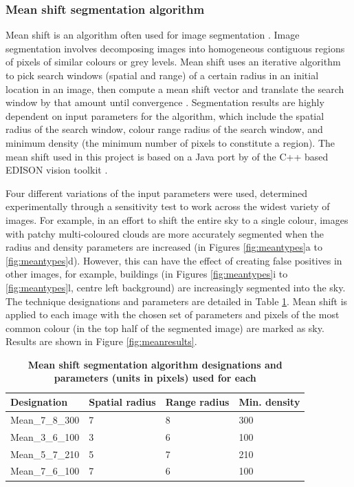 \documentclass[final,3p,times,authoryear]{elsarticle}
\begin{document}
\subsubsection{Mean shift segmentation algorithm}\label{sec:mean}

Mean shift is an algorithm often used for image segmentation \citep{Comaniciu1997,Comaniciu2002}. Image segmentation involves decomposing images into homogeneous contiguous regions of pixels of similar colours or grey levels. Mean shift uses an iterative algorithm to pick search windows (spatial and range) of a certain radius in an initial location in an image, then compute a mean shift vector and translate the search window by that amount until convergence \citep{Comaniciu1997}. Segmentation results are highly dependent on input parameters for the algorithm, which include the spatial radius of the search window, colour range radius of the search window, and minimum density (the minimum number of pixels to constitute a region). The mean shift used in this project is based on a Java port by \cite{Pangburn2002} of the C++ based EDISON vision toolkit \citep{Christoudias2002}. 

Four different variations of the input parameters were used, determined experimentally through a sensitivity test to work across the widest variety of images. For example, in an effort to shift the entire sky to a single colour, images with patchy multi-coloured clouds are more accurately segmented when the radius and density parameters are increased (in Figures \ref{fig:meantypes}a to \ref{fig:meantypes}d). However, this can have the effect of creating false positives in other images, for example, buildings (in Figures \ref{fig:meantypes}i to \ref{fig:meantypes}l, centre left background) are increasingly segmented into the sky. The technique designations and parameters are detailed in Table \ref{tab:techniques2}. Mean shift is applied to each image with the chosen set of parameters and pixels of the most common colour (in the top half of the segmented image) are marked as sky. Results are shown in Figure \ref{fig:meanresults}.


\begin{table}[!htbp]
\caption{\bf Mean shift segmentation algorithm designations and parameters (units in pixels) used for each \label{tab:techniques2}}     
\begin{tabular}{ l l l l}
\textbf{Designation}  & \textbf{Spatial radius}&\textbf{Range radius}&\textbf{Min. density}   \\ \hline
Mean\_7\_8\_300 & 7& 8& 300 \\
Mean\_3\_6\_100	& 3& 6& 100 \\
Mean\_5\_7\_210	& 5& 7& 210 \\	 
Mean\_7\_6\_100	& 7& 6& 100 \\

\hline
\end{tabular}
\end{table}
\end{document}

